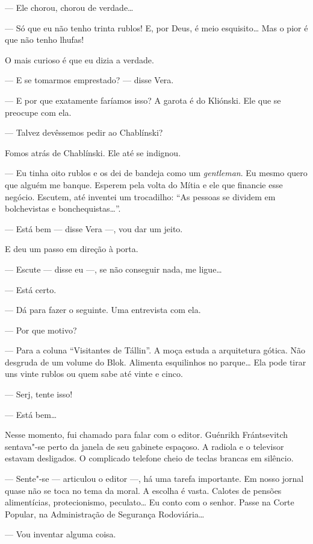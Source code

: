 --- Ele chorou, chorou de verdade\ldots{}

--- Só que eu não tenho trinta rublos! E, por Deus, é meio esquisito\ldots{}
Mas o pior é que não tenho lhufas!

O mais curioso é que eu dizia a verdade.

--- E se tomarmos emprestado? --- disse Vera.

--- E por que exatamente faríamos isso? A garota é do Kliónski. Ele que
se preocupe com ela.

--- Talvez devêssemos pedir ao Chablínski?

Fomos atrás de Chablínski. Ele até se indignou.

--- Eu tinha oito rublos e os dei de bandeja como um \emph{gentleman}.
Eu mesmo quero que alguém me banque. Esperem pela volta do Mítia e ele
que financie esse negócio. Escutem, até inventei um trocadilho: ``As
pessoas se dividem em bolchevistas e bonchequistas\ldots{}''.

--- Está bem --- disse Vera ---, vou dar um jeito.

E deu um passo em direção à porta.

--- Escute --- disse eu ---, se não conseguir nada, me ligue\ldots{}

--- Está certo.

--- Dá para fazer o seguinte. Uma entrevista com ela.

--- Por que motivo?

--- Para a coluna ``Visitantes de Tállin''. A moça estuda a arquitetura
gótica. Não desgruda de um volume do Blok. Alimenta esquilinhos no
parque\ldots{} Ela pode tirar uns vinte rublos ou quem sabe até vinte e
cinco.

--- Serj, tente isso!

--- Está bem\ldots{}

\bigskip

Nesse momento, fui chamado para falar com o editor. Guénrikh
Frántsevitch sentava"-se perto da janela de seu gabinete espaçoso. A
radiola e o televisor estavam desligados. O complicado telefone cheio de
teclas brancas em silêncio.

--- Sente"-se --- articulou o editor ---, há uma tarefa importante. Em
nosso jornal quase não se toca no tema da moral. A escolha é vasta.
Calotes de pensões alimentícias, protecionismo, peculato\ldots{} Eu conto com o senhor. Passe na Corte Popular, na
Administração de Segurança Rodoviária\ldots{}

--- Vou inventar alguma coisa.

